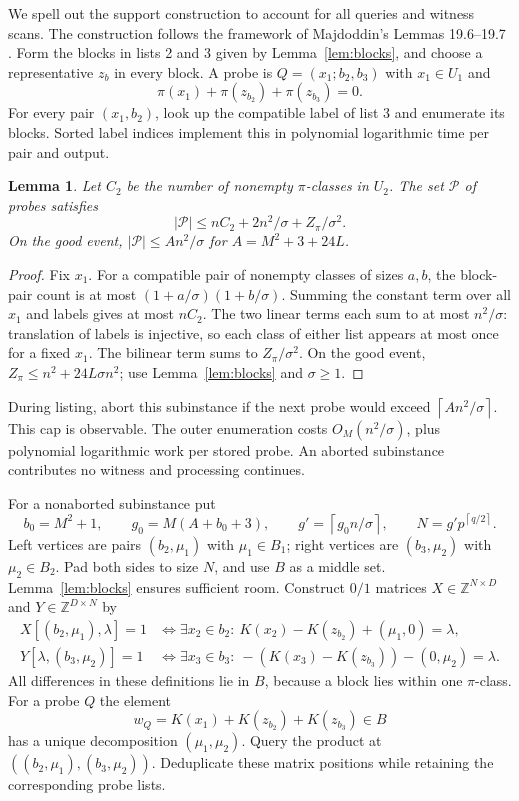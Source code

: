 \documentclass[acmsmall,11pt,nonacm,natbib=false]{acmart}
\newtheorem{lemma}[theorem]{Lemma}
\newcommand{\Z}{\mathbb Z}
\newcommand{\ceil}[1]{\left\lceil #1\right\rceil}
\begin{document}
We spell out the support construction to account for all queries and
witness scans. The construction follows the framework of Majdoddin's
Lemmas 19.6--19.7 \cite{Maj26}. Form the blocks in lists 2 and 3 given by
Lemma~\ref{lem:blocks}, and choose a representative $z_b$ in every block.
A probe is $Q=(x_1;b_2,b_3)$ with $x_1\in U_1$ and
\[
 \pi(x_1)+\pi(z_{b_2})+\pi(z_{b_3})=0.
\]
For every pair $(x_1,b_2)$, look up the compatible label of list 3 and
enumerate its blocks. Sorted label indices implement this in polynomial
logarithmic time per pair and output.

\begin{lemma}\label{lem:probes}
Let $C_2$ be the number of nonempty $\pi$-classes in $U_2$. The set
$\mathcal P$ of probes satisfies
\begin{equation}\label{eq:probes}
 |\mathcal P|\le n C_2+2n^2/\sigma+Z_\pi/\sigma^2.
\end{equation}
On the good event, $|\mathcal P|\le A n^2/\sigma$ for
$A=M^2+3+24L$.
\end{lemma}
\begin{proof}
Fix $x_1$. For a compatible pair of nonempty classes of sizes $a,b$,
the block-pair count is at most
$(1+a/\sigma)(1+b/\sigma)$. Summing the constant term over all $x_1$
and labels gives at most $nC_2$. The two linear terms each sum to at most
$n^2/\sigma$: translation of labels is injective, so each class of either
list appears at most once for a fixed $x_1$. The bilinear term sums to
$Z_\pi/\sigma^2$. On the good event,
$Z_\pi\le n^2+24L\sigma n^2$; use Lemma~\ref{lem:blocks} and $\sigma\ge1$.
\end{proof}

During listing, abort this subinstance if the next probe would exceed
$\ceil{A n^2/\sigma}$. This cap is observable. The outer enumeration costs
$O_M(n^2/\sigma)$, plus polynomial logarithmic work per stored probe.
An aborted subinstance contributes no witness and processing continues.

For a nonaborted subinstance put
\[
 b_0=M^2+1,\qquad g_0=M(A+b_0+3),\qquad
 g'=\ceil{g_0n/\sigma},\qquad N=g'p^{\ceil{q/2}}.
\]
Left vertices are pairs $(b_2,\mu_1)$ with $\mu_1\in B_1$; right vertices
are $(b_3,\mu_2)$ with $\mu_2\in B_2$. Pad both sides to size $N$, and use
$B$ as a middle set. Lemma~\ref{lem:blocks} ensures sufficient room.
Construct $0/1$ matrices $X\in\Z^{N\times D}$ and
$Y\in\Z^{D\times N}$ by
\begin{align}
 X[(b_2,\mu_1),\lambda]=1
 &\iff \exists x_2\in b_2:\
 K(x_2)-K(z_{b_2})+(\mu_1,0)=\lambda,\label{eq:X}\\
 Y[\lambda,(b_3,\mu_2)]=1
 &\iff \exists x_3\in b_3:\
 -(K(x_3)-K(z_{b_3}))-(0,\mu_2)=\lambda.\label{eq:Y}
\end{align}
All differences in these definitions lie in $B$, because a block lies
within one $\pi$-class. For a probe $Q$ the element
\[
 w_Q=K(x_1)+K(z_{b_2})+K(z_{b_3})\in B
\]
has a unique decomposition $(\mu_1,\mu_2)$. Query the product at
$((b_2,\mu_1),(b_3,\mu_2))$. Deduplicate these matrix positions while
retaining the corresponding probe lists.
\end{document}
